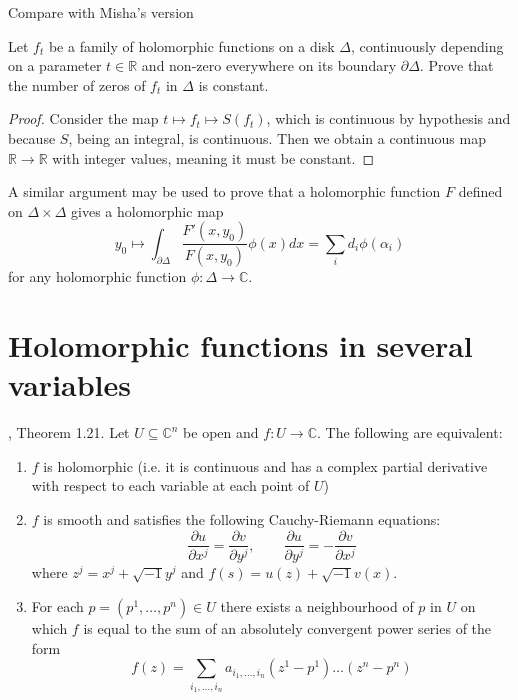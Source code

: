 Compare with Misha's version

\begin{theorem}
\label{theorem-Rouche-theorem-Mishas-version}
Let $f_t$ be a family of holomorphic functions on a disk  $\Delta$, continuously
depending on a parameter $t\in \mathbb{R}$ and non-zero everywhere on its
boundary $\partial\Delta$. Prove that the number of zeros of $f_t$ in $\Delta$
is constant.
\end{theorem}

\begin{proof}
Consider the map $t\mapsto f_t\mapsto S(f_t)$, which is continuous by hypothesis
and because $S$, being an integral, is continuous. Then we obtain a continuous
map $\mathbb{R}\to\mathbb{R}$ with integer values, meaning it must be constant.
\end{proof}

A similar argument may be used to prove that a holomorphic function $F$ defined
on $\Delta\times\Delta$ gives a holomorphic map 
\begin{equation}
\label{equation-zeros-on-polydisk}
y_0\mapsto \int_{\partial\Delta}\frac{F'(x,y_0)}{F(x,y_0)}\phi(x)dx
=\sum_id_i\phi(\alpha_i)
\end{equation}
for any holomorphic function $\phi:\Delta\to\mathbb{C}$.

\section{Holomorphic functions in several variables}
\label{section-holomorphic-functions-in-several-variables}

\begin{lemma}
\label{lemma-holomorphic-function-characterization}
\cite{lec}, Theorem 1.21. Let $U\subseteq\mathbb{C}^n$ be open and $f:U\to
\mathbb{C}$. The following are equivalent:
\begin{enumerate}
\item $f$ is holomorphic (i.e. it is continuous and has a complex partial
derivative with respect to each variable at each point of $U$)
\item $f$ is smooth and satisfies the following Cauchy-Riemann equations:
\begin{equation}
\label{equationcauchy-riemann-several-variables}
\frac{\partial u}{\partial x^j}=\frac{\partial v}{\partial y^j},\qquad 
\frac{\partial u}{\partial y^j}=-\frac{\partial v}{\partial x^j}
\end{equation}
where $z^j=x^j+\sqrt{-1}y^j$ and $f(s)=u(z)+\sqrt{-1}v(x)$.
\item For each $p=(p^1,\ldots,p^n)\in U$ there exists a neighbourhood of $p$ in
$U$ on which $f$ is equal to the sum of an absolutely convergent power series of
the form
\begin{equation}
\label{equation-Taylor-series-several-variables}
f(z)=\sum_{i_1,\ldots,i_n}a_{i_1,\ldots,i_n}(z^1-p^1)\ldots(z^n-p^n)
\end{equation}
\end{enumerate}
\end{lemma}

